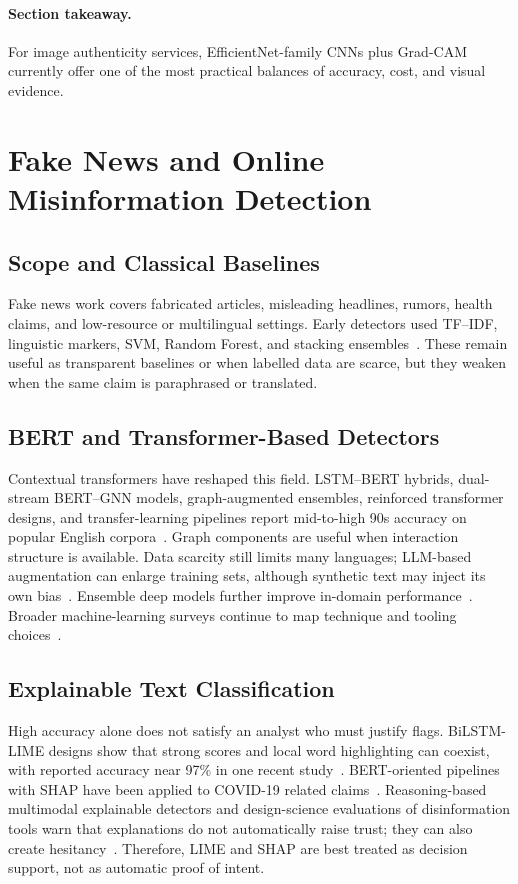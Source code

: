 \documentclass[runningheads]{llncs}
\begin{document}
\paragraph{Section takeaway.}
For image authenticity services, EfficientNet-family CNNs plus Grad-CAM currently offer one of the most practical balances of accuracy, cost, and visual evidence.

\section{Fake News and Online Misinformation Detection}
\label{sec:fakenews}

\subsection{Scope and Classical Baselines}
Fake news work covers fabricated articles, misleading headlines, rumors, health claims, and low-resource or multilingual settings. Early detectors used TF--IDF, linguistic markers, SVM, Random Forest, and stacking ensembles~\cite{r21,r24}. These remain useful as transparent baselines or when labelled data are scarce, but they weaken when the same claim is paraphrased or translated.

\subsection{BERT and Transformer-Based Detectors}
Contextual transformers have reshaped this field. LSTM--BERT hybrids, dual-stream BERT--GNN models, graph-augmented ensembles, reinforced transformer designs, and transfer-learning pipelines report mid-to-high 90s accuracy on popular English corpora~\cite{r25,r27,r32,r33,r36}. Graph components are useful when interaction structure is available. Data scarcity still limits many languages; LLM-based augmentation can enlarge training sets, although synthetic text may inject its own bias~\cite{r03}. Ensemble deep models further improve in-domain performance~\cite{r28}. Broader machine-learning surveys continue to map technique and tooling choices~\cite{r30}.

\subsection{Explainable Text Classification}
High accuracy alone does not satisfy an analyst who must justify flags. BiLSTM-LIME designs show that strong scores and local word highlighting can coexist, with reported accuracy near 97\% in one recent study~\cite{r26}. BERT-oriented pipelines with SHAP have been applied to COVID-19 related claims~\cite{r40}. Reasoning-based multimodal explainable detectors and design-science evaluations of disinformation tools warn that explanations do not automatically raise trust; they can also create hesitancy~\cite{r22,r29,r35}. Therefore, LIME and SHAP are best treated as decision support, not as automatic proof of intent.
\end{document}
